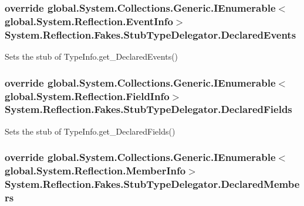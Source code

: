 \hypertarget{class_system_1_1_reflection_1_1_fakes_1_1_stub_type_delegator_ac6b9bf04780088e42aa0364d3d5fdd08}{
\subsubsection[{Declared\-Events}]{\setlength{\rightskip}{0pt plus 5cm}override global.\-System.\-Collections.\-Generic.\-I\-Enumerable$<$global.\-System.\-Reflection.\-Event\-Info$>$ System.\-Reflection.\-Fakes.\-Stub\-Type\-Delegator.\-Declared\-Events\hspace{0.3cm}{\ttfamily [get]}}}\label{class_system_1_1_reflection_1_1_fakes_1_1_stub_type_delegator_ac6b9bf04780088e42aa0364d3d5fdd08}


Sets the stub of Type\-Info.\-get\-\_\-\-Declared\-Events()

\hypertarget{class_system_1_1_reflection_1_1_fakes_1_1_stub_type_delegator_abe57bbceb219388d76a3197b6795c4ed}{
\subsubsection[{Declared\-Fields}]{\setlength{\rightskip}{0pt plus 5cm}override global.\-System.\-Collections.\-Generic.\-I\-Enumerable$<$global.\-System.\-Reflection.\-Field\-Info$>$ System.\-Reflection.\-Fakes.\-Stub\-Type\-Delegator.\-Declared\-Fields\hspace{0.3cm}{\ttfamily [get]}}}\label{class_system_1_1_reflection_1_1_fakes_1_1_stub_type_delegator_abe57bbceb219388d76a3197b6795c4ed}


Sets the stub of Type\-Info.\-get\-\_\-\-Declared\-Fields()

\hypertarget{class_system_1_1_reflection_1_1_fakes_1_1_stub_type_delegator_a5e754598f03310158377881c06a0dfa6}{
\subsubsection[{Declared\-Members}]{\setlength{\rightskip}{0pt plus 5cm}override global.\-System.\-Collections.\-Generic.\-I\-Enumerable$<$global.\-System.\-Reflection.\-Member\-Info$>$ System.\-Reflection.\-Fakes.\-Stub\-Type\-Delegator.\-Declared\-Members\hspace{0.3cm}{\ttfamily [get]}}}\label{class_system_1_1_reflection_1_1_fakes_1_1_stub_type_delegator_a5e754598f03310158377881c06a0dfa6}


